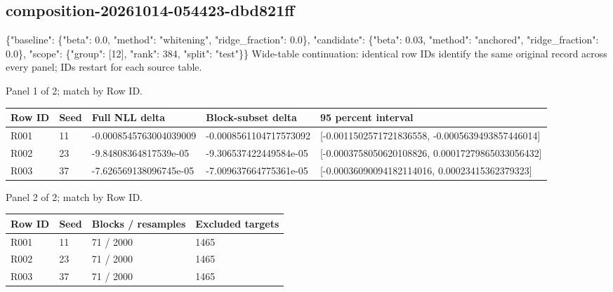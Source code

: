 \documentclass[10pt]{article}
\begin{document}
\subsection{composition-20261014-054423-dbd821ff}
\{"baseline": \{"beta": 0.0, "method": "whitening", "ridge\_fraction": 0.0\}, "candidate": \{"beta": 0.03, "method": "anchored", "ridge\_fraction": 0.0\}, "scope": \{"group": [12], "rank": 384, "split": "test"\}\}
Wide-table continuation: identical row IDs identify the same original record across every panel; IDs restart for each source table.
\par\noindent Panel 1 of 2; match by Row ID.
{\scriptsize\setlength{\tabcolsep}{2pt}
\begin{longtable}{p{}p{}p{}p{}p{}}
Row ID & Seed & Full NLL delta & Block-subset delta & 95 percent interval \\
\hline\endhead
R001 & 11 & -0.0008545763004039009 & -0.0008561104717573092 & [-0.0011502571721836558, -0.0005639493857446014] \\
R002 & 23 & -9.84808364817539e-05 & -9.306537422449584e-05 & [-0.0003758050620108826, 0.00017279865033056432] \\
R003 & 37 & -7.626569138096745e-05 & -7.009637664775361e-05 & [-0.00036090094182114016, 0.00023415362379323] \\
\end{longtable}}
\par\noindent Panel 2 of 2; match by Row ID.
{\scriptsize\setlength{\tabcolsep}{2pt}
\begin{longtable}{p{}p{}p{}p{}}
Row ID & Seed & Blocks / resamples & Excluded targets \\
\hline\endhead
R001 & 11 & 71 / 2000 & 1465 \\
R002 & 23 & 71 / 2000 & 1465 \\
R003 & 37 & 71 / 2000 & 1465 \\
\end{longtable}}
\end{document}
